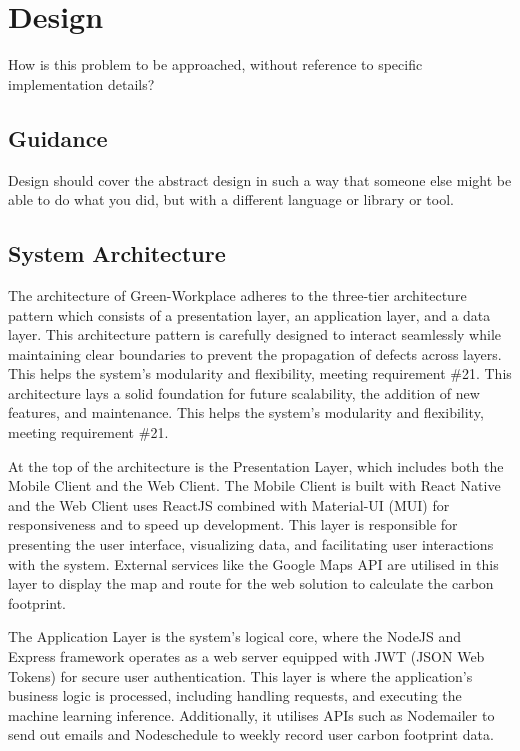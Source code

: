 \documentclass{l4proj}
\begin{document}
\chapter{Design}
How is this problem to be approached, without reference to specific implementation details? 
\section{Guidance}
Design should cover the abstract design in such a way that someone else might be able to do what you did, but with a different language or library or tool.

\section{System Architecture}

The architecture of Green-Workplace adheres to the three-tier architecture pattern which consists of a presentation layer, an application layer, and a data layer. This architecture pattern is carefully designed to interact seamlessly while maintaining clear boundaries to prevent the propagation of defects across layers. This helps the system's modularity and flexibility, meeting requirement \#21. This architecture lays a solid foundation for future scalability, the addition of new features, and maintenance. This helps the system's modularity and flexibility, meeting requirement \#21.

At the top of the architecture is the Presentation Layer, which includes both the Mobile Client and the Web Client. The Mobile Client is built with React Native and the Web Client uses ReactJS combined with Material-UI (MUI) for responsiveness and to speed up development. This layer is responsible for presenting the user interface, visualizing data, and facilitating user interactions with the system. External services like the Google Maps API are utilised in this layer to display the map and route for the web solution to calculate the carbon footprint.

The Application Layer is the system's logical core, where the NodeJS and Express framework operates as a web server equipped with JWT (JSON Web Tokens) for secure user authentication. This layer is where the application's business logic is processed, including handling requests, and executing the machine learning inference. Additionally, it utilises APIs such as Nodemailer to send out emails and Nodeschedule to weekly record user carbon footprint data. 
\end{document}
